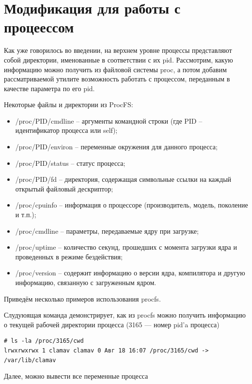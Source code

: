 \documentclass[a4paper, 12pt]{article}		%
\begin{document}
\newpage%
\section{Модификация для работы с процеессом}

Как уже говорилось во введении, на верхнем уровне процессы представляют собой директории, именованные в соответствии с их pid. Рассмотрим, какую информацию можно получить из файловой системы proc, а потом добавим рассматриваемой утилите возможность работать с процессом, переданным в качестве параметра по его pid.

Некоторые файлы и директории из ProcFS:
\begin{itemize}
\item /proc/PID/cmdline – аргументы командной строки (где PID – идентификатор процесса или self);
\item /proc/PID/environ – переменные окружения для данного процесса;
\item /proc/PID/status – статус процесса;
\item /proc/PID/fd – директория, содержащая символьные ссылки на каждый открытый файловый дескриптор;
\item /proc/cpuinfo – информация о процессоре (производитель, модель, поколение и т.п.);
\item /proc/cmdline – параметры, передаваемые ядру при загрузке;
\item /proc/uptime – количество секунд, прошедших с момента загрузки ядра и проведенных в режиме бездействия;
\item /proc/version – содержит информацию о версии ядра, компилятора и другую информацию, связанную с загруженным ядром.
\end{itemize}

Приведём несколько примеров использования procfs.

Слудуюящая команда демонстрирует, как из procfs можно получить информацию о текущей рабочей директории процесса (3165 — номер pid’a процесса)

\begin{verbatim}
# ls -la /proc/3165/cwd
lrwxrwxrwx 1 clamav clamav 0 Авг 18 16:07 /proc/3165/cwd -> /var/lib/clamav
\end{verbatim}

Далее, можно вывести все переменные процесса
\end{document}
